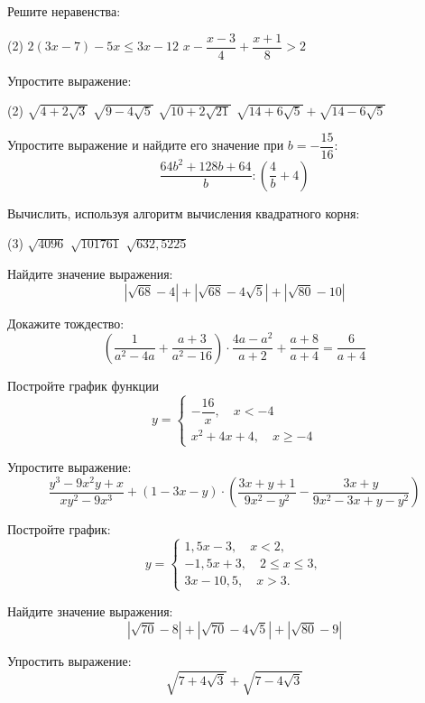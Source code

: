 \begin{class}[number=9]
	\begin{listofex}
		\item Решите неравенства:
		\begin{tasks}(2)
			\task \( 2(3x-7)-5x\leq3x-12 \)
			\task \( x-\dfrac{x-3}{4}+\dfrac{x+1}{8}>2 \)
		\end{tasks}
		\item Упростите выражение:
		\begin{tasks}(2)
			\task \( \sqrt{4+2\sqrt{3}} \)
			\task \( \sqrt{9-4\sqrt{5}} \)
			\task \( \sqrt{10+2\sqrt{21}} \)
			\task \( \sqrt{14+6\sqrt{5}}+\sqrt{14-6\sqrt{5}} \)
		\end{tasks}
		\item Упростите выражение и найдите его значение при \( b=-\dfrac{15}{16} \):
		\[\dfrac{64b^2+128b+64}{b}:\left( \dfrac{4}{b}+4 \right)\]
		\item Вычислить, используя алгоритм вычисления квадратного корня:
		\begin{tasks}(3)
			\task \( \sqrt{4096} \)
			\task \( \sqrt{101761} \)
			\task \( \sqrt{632,5225} \)
		\end{tasks}
		\item Найдите значение выражения:
		\[|\sqrt{68}-4|+|\sqrt{68}-4\sqrt{5}|+|\sqrt{80}-10|\]
		\item Докажите тождество:
		\[\left( \dfrac{1}{a^2-4a}+\dfrac{a+3}{a^2-16} \right)\cdot\dfrac{4a-a^2}{a+2}+\dfrac{a+8}{a+4}=\dfrac{6}{a+4}\]
		\item  Постройте график функции
		\[y=	 \left\{
		\begin{array}{l}
			-\dfrac{16}{x}, \quad x<-4\\
			x^2+4x+4, \quad x\geq-4
		\end{array}
		\right. \]
	\end{listofex}
\end{class}

\begin{homework}[number=3]
	\begin{listofex}
		\item Упростите выражение:
		\[\dfrac{y^3-9x^2y+x}{xy^2-9x^3}+(1-3x-y)\cdot\left( \dfrac{3x+y+1}{9x^2-y^2}-\dfrac{3x+y}{9x^2-3x+y-y^2} \right)\]
		\item Постройте график:
		\[ y=	 \left\{
		\begin{array}{l}
			1,5x-3, \quad x<2,\\
			-1,5x+3, \quad 2\leq x\leq3,\\
			3x-10,5, \quad x>3.
		\end{array}
		\right. \]
		\item Найдите значение выражения:
		\[|\sqrt{70}-8|+|\sqrt{70}-4\sqrt{5}|+|\sqrt{80}-9|\]
		\item Упростить выражение:
		\[\sqrt{7+4\sqrt{3}}+\sqrt{7-4\sqrt{3}}\]
	\end{listofex}
\end{homework}
